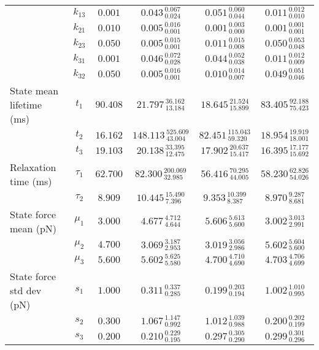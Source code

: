 \begin{table*}
\begin{tabular*}{\textwidth}{@{\extracolsep{\fill}}lccccc}
		& $k_{13}$ & $0.001$ & $0.043_{\:0.024}^{\:0.067}$ & $0.051_{\:0.044}^{\:0.060}$ & $0.011_{\:0.010}^{\:0.012}$ \\
		& $k_{21}$ & $0.010$ & $0.005_{\:0.001}^{\:0.016}$ & $0.001_{\:0.000}^{\:0.003}$ & $0.001_{\:0.001}^{\:0.001}$ \\
		& $k_{23}$ & $0.050$ & $0.005_{\:0.001}^{\:0.015}$ & $0.011_{\:0.008}^{\:0.015}$ & $0.050_{\:0.048}^{\:0.053}$ \\
		& $k_{31}$ & $0.001$ & $0.046_{\:0.028}^{\:0.072}$ & $0.044_{\:0.038}^{\:0.052}$ & $0.011_{\:0.009}^{\:0.012}$ \\
		& $k_{32}$ & $0.050$ & $0.005_{\:0.001}^{\:0.016}$ & $0.010_{\:0.007}^{\:0.014}$ & $0.049_{\:0.046}^{\:0.051}$ \\
		\hline
		State mean lifetime (ms) 		& $t_{1}$ & $90.408$ & $21.797_{\:13.184}^{\:36.162}$ & $18.645_{\:15.899}^{\:21.524}$ & $83.405_{\:75.423}^{\:92.188}$ \\
		& $t_{2}$ & $16.162$ & $148.113_{\:43.004}^{\:525.609}$ & $82.451_{\:59.320}^{\:115.043}$ & $18.954_{\:18.001}^{\:19.919}$ \\
		& $t_{3}$ & $19.103$ & $20.138_{\:12.475}^{\:33.395}$ & $17.902_{\:15.417}^{\:20.637}$ & $16.395_{\:15.692}^{\:17.177}$ \\
		\hline
		Relaxation time (ms) 		& $\tau_{1}$ & $62.700$ & $82.300_{\:32.985}^{\:200.069}$ & $56.416_{\:44.005}^{\:70.295}$ & $58.230_{\:54.026}^{\:62.826}$ \\
		& $\tau_{2}$ & $8.909$ & $10.445_{\:7.396}^{\:15.490}$ & $9.353_{\:8.387}^{\:10.399}$ & $8.970_{\:8.681}^{\:9.287}$ \\
		\hline
		\hline
		State force mean (pN) 		& $\mu_{1}$ & $3.000$ & $4.677_{\:4.644}^{\:4.712}$ & $5.606_{\:5.600}^{\:5.613}$ & $3.002_{\:2.991}^{\:3.013}$ \\
		& $\mu_{2}$ & $4.700$ & $3.069_{\:2.953}^{\:3.187}$ & $3.019_{\:2.986}^{\:3.056}$ & $5.602_{\:5.600}^{\:5.604}$ \\
		& $\mu_{3}$ & $5.600$ & $5.602_{\:5.580}^{\:5.625}$ & $4.700_{\:4.690}^{\:4.710}$ & $4.703_{\:4.699}^{\:4.706}$ \\
		\hline
		State force std dev (pN) 		& $s_{1}$ & $1.000$ & $0.311_{\:0.285}^{\:0.337}$ & $0.199_{\:0.194}^{\:0.203}$ & $1.002_{\:0.995}^{\:1.010}$ \\
		& $s_{2}$ & $0.300$ & $1.067_{\:0.992}^{\:1.147}$ & $1.012_{\:0.988}^{\:1.039}$ & $0.200_{\:0.199}^{\:0.202}$ \\
		& $s_{3}$ & $0.200$ & $0.210_{\:0.195}^{\:0.229}$ & $0.297_{\:0.290}^{\:0.305}$ & $0.299_{\:0.296}^{\:0.301}$ \\
		\hline
\hline
\end{tabular*}
\end{table*}
